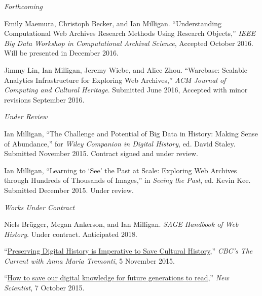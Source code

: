\documentclass[11pt,article,oneside]{memoir}
\begin{document}
\bigskip

\noindent\emph{Forthcoming\vspace{0.05in}}

\ind Emily Maemura, Christoph Becker, and Ian Milligan. ``Understanding Computational Web Archives Research Methods Using Research Objects,'' \emph{IEEE Big Data Workshop in Computational Archival Science}, Accepted October 2016. Will be presented in December 2016.

\ind Jimmy Lin, Ian Milligan, Jeremy Wiebe, and Alice Zhou. ``Warcbase: Scalable Analytics Infrastructure for Exploring Web Archives,'' \emph{ACM Journal of Computing and Cultural Heritage}. Submitted June 2016, Accepted with minor revisions September 2016.

\bigskip 

\noindent\emph{Under Review\vspace{0.05in}}

\ind Ian Milligan, ``The Challenge and Potential of Big Data in History: Making Sense of Abundance,'' for \emph{Wiley Companion in Digital History}, ed. David Staley. Submitted November 2015. Contract signed and under review.

\ind Ian Milligan, ``Learning to `See' the Past at Scale: Exploring Web Archives through Hundreds of Thousands of Images,'' in \emph{Seeing the Past}, ed. Kevin Kee. Submitted December 2015. Under review.

\bigskip

\noindent\emph{Works Under Contract \vspace{0.05in}}

\ind Niels Br\"ugger, Megan Ankerson, and Ian Milligan. \emph{SAGE Handbook of Web History}. Under contract. Anticipated 2018.

\bigskip


\medskip

\ind ``\href{http://www.cbc.ca/radio/thecurrent/the-current-for-november-5-2015-1.3305130/preserving-digital-history-is-imperative-to-save-cultural-history-1.3305263}{Preserving Digital History is Imperative to Save Cultural History},'' \emph{CBC's The Current with Anna Maria Tremonti}, 5 November 2015.

\ind ``\href{https://www.newscientist.com/article/mg22830422-900-how-to-save-our-digital-knowledge-for-future-generations-to-read/?utm_source=NSNS}{How to save our digital knowledge for future generations to read},'' \emph{New Scientist}, 7 October 2015.
\end{document}
